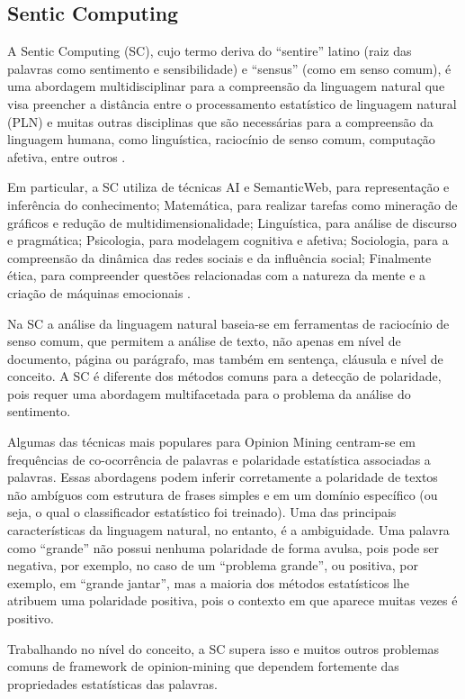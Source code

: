 \documentclass[
	12pt,				%
	openright,			%
	oneside,			%
	a4paper,			%
	english,			%
	spanish,			%
	brazil				%
	]{abntex2}
\begin{document}
\subsection{Sentic Computing}

A Sentic Computing (SC), cujo termo deriva do ``sentire'' latino (raiz das palavras como sentimento e sensibilidade) e ``sensus'' (como em senso comum),  é uma abordagem multidisciplinar para a compreensão da linguagem natural que visa preencher a distância entre o processamento estatístico de linguagem natural (PLN) e muitas outras disciplinas que são necessárias para a compreensão da linguagem humana, como linguística, raciocínio de senso comum, computação afetiva, entre outros \cite{book_Cambria2015}.

Em particular, a SC utiliza de técnicas AI e SemanticWeb, para representação e inferência do conhecimento; Matemática, para realizar tarefas como mineração de gráficos e redução de multidimensionalidade; Linguística, para análise de discurso e pragmática; Psicologia, para modelagem cognitiva e afetiva; Sociologia, para a compreensão da dinâmica das redes sociais e da influência social; Finalmente ética, para compreender questões relacionadas com a natureza da mente e a criação de máquinas emocionais \cite{inBook_Bisio2017}.

Na SC a análise da linguagem natural baseia-se em ferramentas de raciocínio de senso comum, que permitem a análise de texto, não apenas em nível de documento, página ou parágrafo, mas também em sentença, cláusula e nível de conceito. A SC é diferente dos métodos comuns para a detecção de polaridade, pois requer uma abordagem multifacetada para o problema da análise do sentimento.

Algumas das técnicas mais populares para Opinion Mining centram-se em frequências de co-ocorrência de palavras e polaridade estatística associadas a palavras. Essas abordagens podem inferir corretamente a polaridade de textos não ambíguos com estrutura de frases simples e em um domínio específico (ou seja, o qual o classificador estatístico foi treinado). Uma das principais características da linguagem natural, no entanto, é a ambiguidade. Uma palavra como ``grande'' não possui nenhuma polaridade de forma avulsa, pois pode ser negativa, por exemplo, no caso de um ``problema grande'', ou positiva, por exemplo, em ``grande jantar'', mas a maioria dos métodos estatísticos lhe atribuem uma polaridade positiva, pois o contexto em que aparece muitas vezes é positivo.

Trabalhando no nível do conceito, a SC supera isso e muitos outros problemas comuns de framework de opinion-mining que dependem fortemente das propriedades estatísticas das palavras. 
\end{document}
